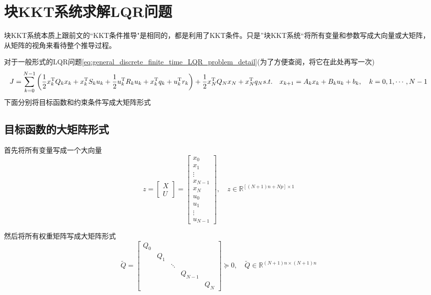 \documentclass[withoutpreface,bwprint]{NoteBook}
\begin{document}
\section{块KKT系统求解LQR问题}

块KKT系统本质上跟前文的“KKT条件推导"是相同的，都是利用了KKT条件。只是”块KKT系统“将所有变量和参数写成大向量或大矩阵，从矩阵的视角来看待整个推导过程。

对于一般形式的LQR问题\cref{eq:general_discrete_finite_time_LQR_problem_detail}(为了方便查阅，将它在此处再写一次)
$$
J= \sum_{k=0}^{N-1} \left( \frac{1}{2}x_k^\mathrm{T} Q_k x_k
+ x_k^\mathrm{T} S_k u_k
+ \frac{1}{2}u_k^\mathrm{T} R_k u_k + x_k^\mathrm{T}q_k
+ u_k^\mathrm{T} r_k \right) 
+ \frac{1}{2}x_N^\mathrm{T} Q_N x_N + x_N^\mathrm{T}q_N\\

s.t.\quad  x_{k+1} = A_k x_k + B_k u_k + b_k, \quad k=0,1,\cdots,N-1
$$
下面分别将目标函数和约束条件写成大矩阵形式

\subsection{目标函数的大矩阵形式}

首先将所有变量写成一个大向量
\begin{equation}
\label{eq:block_KKT_big_z}
z=\begin{bmatrix}
X\\U
\end{bmatrix} 
= \begin{bmatrix}
x_0 \\ x_1 \\ \vdots \\ x_{N-1} \\x_N \\ 
u_0 \\ u_1 \\ \vdots \\u_{N-1}
\end{bmatrix}
,\quad z \in \mathbb{R}^{[(N+1)n+Np] \times 1}
\end{equation}

然后将所有权重矩阵写成大矩阵形式
\begin{equation}
\label{eq:block_KKT_big_Q_define}
\tilde{Q} = \begin{bmatrix}
Q_0 & & & & \\
& Q_1 & & & \\
& & \ddots &&  \\
& & & Q_{N-1} & \\
& & & &  Q_N
\end{bmatrix} \succeq 0 
,\quad \tilde{Q} \in \mathbb{R}^{(N+1) n \times (N+1) n}
\end{equation}
\end{document}
